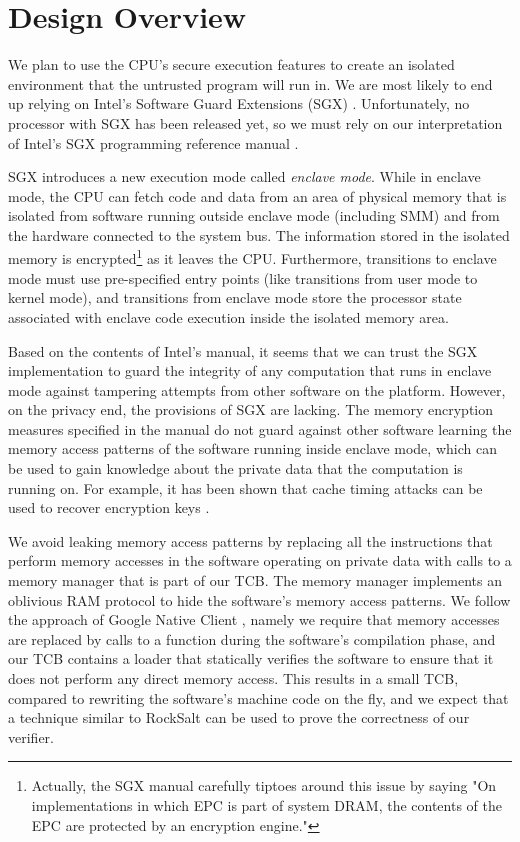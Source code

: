 \section{Design Overview}
\label{sec:overview}

We plan to use the CPU's secure execution features to create an isolated
environment that the untrusted program will run in. We are most likely to end
up relying on Intel's Software Guard Extensions (SGX) \cite{anati2013sgx}.
Unfortunately, no processor with SGX has been released yet, so we must rely on
our interpretation of Intel's SGX programming reference manual
\cite{intel2013sgxmanual}.

SGX introduces a new execution mode called \textit{enclave mode}. While in
enclave mode, the CPU can fetch code and data from an area of physical memory
that is isolated from software running outside enclave mode (including SMM) and
from the hardware connected to the system bus. The information stored in the
isolated memory is encrypted\footnote{Actually, the SGX manual carefully
tiptoes around this issue by saying "On implementations in which EPC is part of
system DRAM, the contents of the EPC are protected by an encryption engine."}
as it leaves the CPU. Furthermore, transitions to enclave mode must use
pre-specified entry points (like transitions from user mode to kernel mode),
and transitions from enclave mode store the processor state associated with
enclave code execution inside the isolated memory area.

Based on the contents of Intel's manual, it seems that we can trust the SGX
implementation to guard the integrity of any computation that runs in enclave
mode against tampering attempts from other software on the platform. However,
on the privacy end, the provisions of SGX are lacking. The memory encryption
measures specified in the manual do not guard against other software learning
the memory access patterns of the software running inside enclave mode, which
can be used to gain knowledge about the private data that the computation is
running on. For example, it has been shown that cache timing attacks can be
used to recover encryption keys \cite{bonneau2006cache}
\cite{brumley2005remote} \cite{kocher1996timing}.

We avoid leaking memory access patterns by replacing all the instructions that
perform memory accesses in the software operating on private data with calls
to a memory manager that is part of our TCB. The memory manager implements an
oblivious RAM protocol \cite{stefanov2012path} to hide the software's memory
access patterns. We follow the approach of Google Native Client
\cite{yee2009native} \cite{sehr2010adapting}, namely we require that memory
accesses are replaced by calls to a function during the software's compilation
phase, and our TCB contains a loader that statically verifies the software to
ensure that it does not perform any direct memory access. This results in a
small TCB, compared to rewriting the software's machine code on the fly, and
we expect that a technique similar to RockSalt \cite{morrisett2012rocksalt} can
be used to prove the correctness of our verifier.

